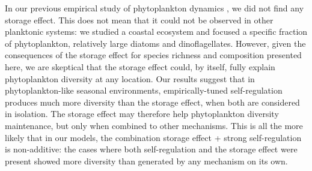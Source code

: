 \documentclass[a4paper,12pt]{article}
\begin{document}
In our previous empirical study of phytoplankton dynamics \citep{barraquand2018coastal},
we did not find any storage effect. This does not mean that it could
not be observed in other planktonic systems: we studied a coastal
ecosystem and focused a specific fraction of phytoplankton, relatively
large diatoms and dinoflagellates. However, given the consequences
of the storage effect for species richness and composition presented
here, we are skeptical that the storage effect could, by itself, fully
explain phytoplankton diversity at any location. Our results suggest
that in phytoplankton-like seasonal environments, empirically-tuned
self-regulation produces much more diversity than the storage effect,
when both are considered in isolation. The storage effect may therefore
help phytoplankton diversity maintenance, but only when combined to
other mechanisms. This is all the more likely that in our models,
the combination storage effect + strong self-regulation is non-additive:
the cases where both self-regulation and the storage effect were present
showed more diversity than generated by any mechanism on its own.
\end{document}
